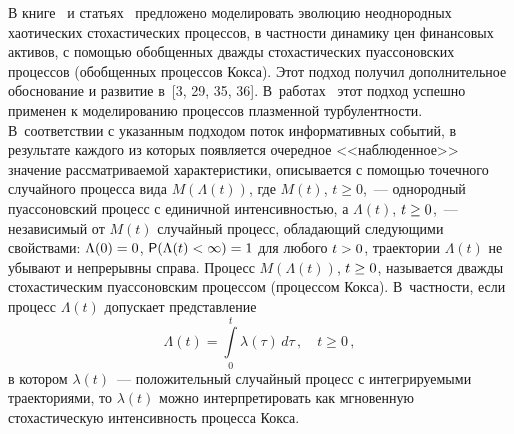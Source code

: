 \begin{multicols}{2}
В книге~\cite{GnedenkoKorolev1996} и статьях~\cite{Korolev1997, Korolev2000} 
предложено моделировать эволюцию неоднородных
хаотических стохастических процессов, в частности динамику цен
финансовых активов, с помощью обобщенных дважды стохастических
пуассоновских процессов (обобщенных процессов Кокса). Этот подход
получил дополнительное обоснование и развитие в~[3, 29, 35, 36]. 
В~работах~\cite{Korolev2011, KorolevSkvortsova2006} этот подход
успешно применен к моделированию процессов плазменной
турбулентности. В~соответствии с указанным подходом поток
информативных событий, в результате каждого из которых появляется
очередное <<наблюденное>> значение рассматриваемой характеристики,
описывается с помощью точечного случайного процесса вида
$M(\Lambda(t))$, где $M(t)$, $t\geq0$,~--- однородный пуассоновский
процесс с единичной интенсивностью, а $\Lambda(t)$, $t\hm\geq0$,~---
независимый от $M(t)$ случайный процесс, обладающий следующими
свойствами: $\Lambda(0)\hm=0$, ${\sf P}(\Lambda(t)\hm<\infty)\hm=1$ для
любого $t\hm>0$, траектории $\Lambda(t)$ не убывают и непрерывны
справа. Процесс $M(\Lambda(t))$, $t\hm\geq0$, называется дважды
стохастическим пуассоновским процессом (процессом Кокса). 
В~частности, если процесс $\Lambda(t)$ допускает представление
$$
\Lambda(t)=\int\limits_{0}^{t}\lambda(\tau)\,d\tau\,,\quad t\geqslant0\,,
$$
в котором $\lambda(t)$~--- положительный случайный процесс с
интегрируемыми траекториями, то $\lambda(t)$ можно интерпретировать
как мгновенную стохастическую интенсивность процесса Кокса.


\end{multicols}
